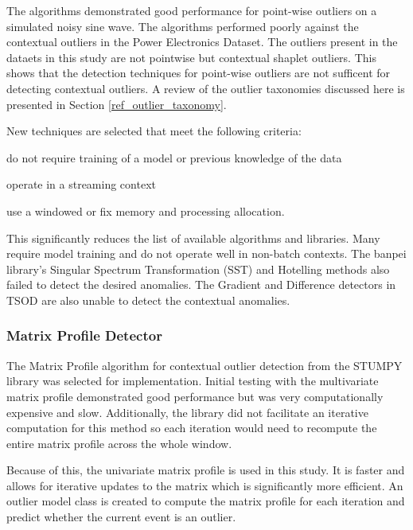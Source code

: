 The algorithms demonstrated good performance for point-wise outliers on a simulated noisy sine wave.
The algorithms performed poorly against the contextual outliers in the Power Electronics Dataset.
The outliers present in the dataets in this study are not pointwise but contextual shaplet outliers.
This shows that the detection techniques for point-wise outliers are not sufficent for detecting contextual outliers.
A review of the outlier taxonomies discussed here is presented in Section \ref{ref_outlier_taxonomy}.

New techniques are selected that meet the following criteria:
\begin{inlinelist}
    \item do not require training of a model or previous knowledge of the data
    \item operate in a streaming context
    \item use a windowed or fix memory and processing allocation.
\end{inlinelist}
This significantly reduces the list of available algorithms and libraries.
Many require model training and do not operate well in non-batch contexts.
The banpei \parencite{banpei} library's Singular Spectrum Transformation (SST) and Hotelling methods also failed to detect the desired anomalies.
The Gradient and Difference detectors in TSOD \parencite{tsod} are also unable to detect the contextual anomalies.

\subsubsection{Matrix Profile Detector}
\label{ref_matrix_profile_detector}

The Matrix Profile algorithm for contextual outlier detection from the STUMPY library \parencite{law2019stumpy} was selected for implementation.
Initial testing with the multivariate matrix profile demonstrated good performance but was very computationally expensive and slow.
Additionally, the library did not facilitate an iterative computation for this method so each iteration would need to recompute the entire matrix profile across the whole window.

Because of this, the univariate matrix profile is used in this study.
It is faster and allows for iterative updates to the matrix which is significantly more efficient.
An outlier model class is created to compute the matrix profile for each iteration and predict whether the current event is an outlier.

